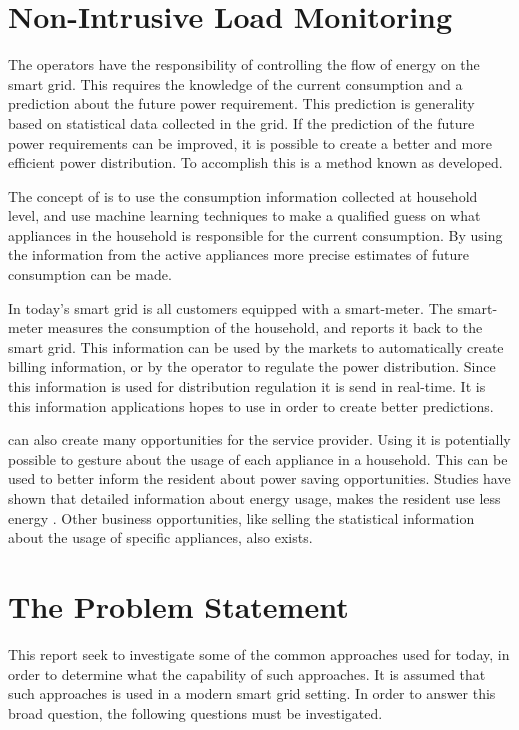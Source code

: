 \newpage
\section{Non-Intrusive Load Monitoring}
The operators have the responsibility of controlling the flow of energy on the smart grid. This requires the knowledge of the current consumption and a prediction about the future power requirement. This prediction is generality based on statistical data collected in the grid. If the prediction of the future power requirements can be improved, it is possible to create a better and more efficient power distribution. To accomplish this is a method known as  developed.

The concept of  is to use the consumption information collected at household level, and use machine learning techniques to make a qualified guess on what appliances in the household is responsible for the current consumption. By using the information from the active appliances more precise estimates of future consumption can be made. 

In today's smart grid is all customers equipped with a smart-meter. The smart-meter measures the consumption of the household, and reports it back to the smart grid. This information can be used by the markets to automatically create billing information, or by the operator to regulate the power distribution. Since this information is used for distribution regulation it is send in real-time. It is this information  applications hopes to use in order to create better predictions.

 can also create many opportunities for the service provider. Using  it is potentially possible to gesture about the usage of each appliance in a household. This can be used to better inform the resident about power saving opportunities. Studies have shown that detailed information about energy usage, makes the resident use less energy . Other business opportunities, like selling the statistical information about the usage of specific appliances, also exists.  

\section{The Problem Statement}

This report seek to investigate some of the common approaches used for  today, in order to determine what the capability of such approaches. It is assumed that such approaches is used in a modern smart grid setting. In order to answer this broad question, the following questions must be investigated. 

